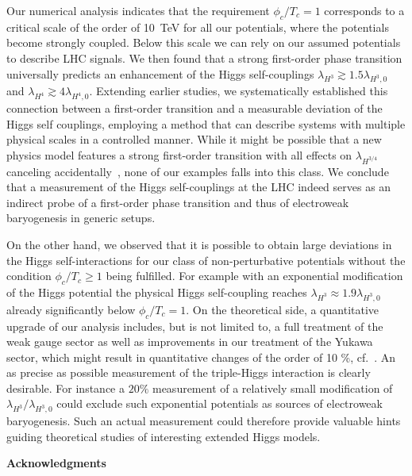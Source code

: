 \documentclass[aps,prd,11pt,tightenlines,superscriptaddress,nofootinbib,preprintnumbers,notitlepage]{revtex4-1}
\begin{document}
Our numerical analysis indicates that the requirement
$\phi_c/T_c=1$ corresponds to a critical scale of the order of 10~TeV
for all our potentials, where the potentials become strongly coupled.
Below this scale we can rely on our assumed potentials to describe LHC
signals. We then found that a strong first-order phase transition
universally predicts an enhancement of the Higgs self-couplings
$\lambda_{H^3} \gtrsim 1.5 \lambda_{H^3,0}$ and $\lambda_{H^4} \gtrsim
4 \lambda_{H^4,0}$.  Extending earlier studies, we systematically
established this connection between a first-order transition and a
measurable deviation of the Higgs self couplings, employing a method
that can describe systems with multiple physical scales in a
controlled manner.  While it might be possible that a new physics
model features a strong first-order transition with all effects on
$\lambda_{H^{3/4}}$ canceling accidentally~\cite{Noble}, none of our
examples falls into this class. We conclude that a measurement of 
the Higgs self-couplings at the LHC indeed serves as an indirect probe of
a first-order phase transition and thus of electroweak
baryogenesis in generic setups.

On the other hand, we observed that it is possible to obtain large 
deviations in the Higgs self-interactions for our class of non-perturbative
potentials without the condition $\phi_c/T_c\geq 1$ being
fulfilled.  For example with an exponential modification of the Higgs
potential the physical Higgs self-coupling reaches $\lambda_{H^3}
\approx 1.9 \lambda_{H^3,0}$ already significantly below $\phi_c/T_c=1$.
On the theoretical side, a quantitative upgrade 
of our analysis includes, but is not limited to, a full treatment 
of the weak gauge sector as well as improvements in our treatment 
of the Yukawa sector, which might result in quantitative changes 
of the order of 10 \%, cf.~\cite{Gies:2017zwf}.
An as precise as possible measurement of the triple-Higgs interaction is
clearly desirable. 
For instance a $20\%$ measurement of a relatively
small modification of $\lambda_{H^3}/\lambda_{H^3,0}$ could exclude
such exponential potentials as sources of electroweak baryogenesis.
Such an actual measurement could therefore provide valuable hints
guiding theoretical studies of interesting extended Higgs models.


\begin{center} \textbf{Acknowledgments} \end{center}
\end{document}
